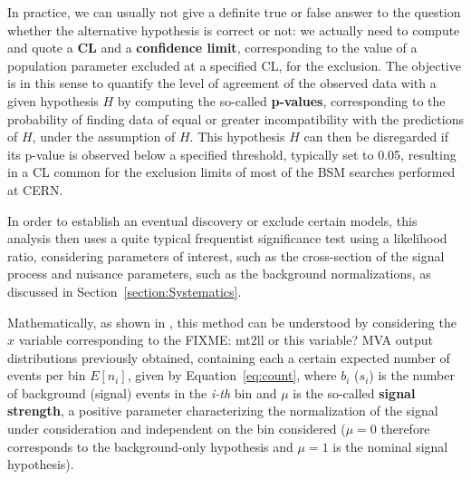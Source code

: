 \documentclass[a4paper, 10pt, openright]{report}
\begin{document}
In practice, we can usually not give a definite true or false answer to the question whether the alternative hypothesis is correct or not: we actually need to compute and quote a \textbf{\ac{CL}} and a \textbf{confidence limit}, corresponding to the value of a population parameter excluded at a specified \ac{CL}, for the exclusion. The objective is in this sense to quantify the level of agreement of the observed data with a given hypothesis $H$ by computing the so-called \textbf{p-values}, corresponding to the probability of finding data of equal or greater incompatibility with the predictions of $H$, under the assumption of $H$. This hypothesis $H$ can then be disregarded if its p-value is observed below a specified threshold, typically set to 0.05, resulting in a \ac{CL} common for the exclusion limits of most of the \ac{BSM} searches performed at \ac{CERN}.

%
%
%

In order to establish an eventual discovery or exclude certain models, this analysis then uses a quite typical frequentist significance test using a likelihood ratio, considering parameters of interest, such as the cross-section of the signal process and nuisance parameters, such as the background normalizations, as discussed in Section~\ref{section:Systematics}. 

Mathematically, as shown in \cite{asymptotic}, this method can be understood by considering the $x$ variable corresponding to the \color{red} FIXME: mt2ll or this variable? \ac{MVA} output distributions \color{black} previously obtained, containing each a certain expected number of events per bin $E[n_i]$, given by Equation~\ref{eq:count}, where $b_i$ ($s_i$) is the number of background (signal) events in the \textit{i-th} bin and $\mu$ is the so-called \textbf{signal strength}, a positive parameter characterizing the normalization of the signal under consideration and independent on the bin considered ($\mu = 0$ therefore corresponds to the background-only hypothesis and $\mu = 1$ is the nominal signal hypothesis).
\end{document}
